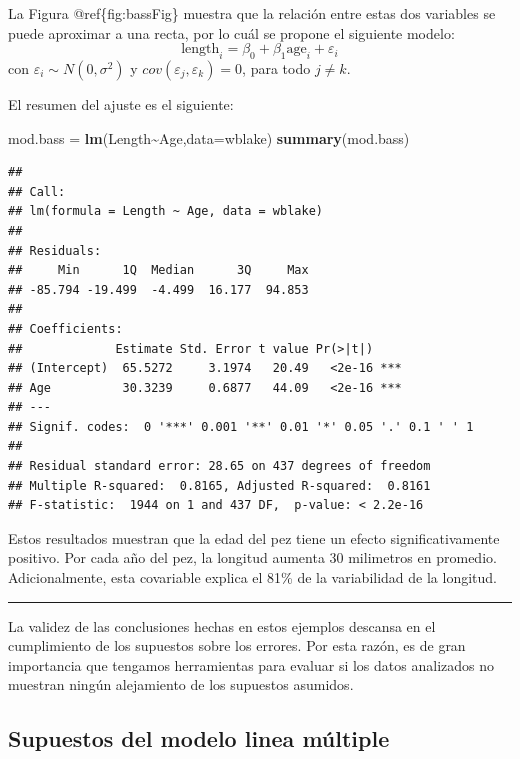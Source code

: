 \documentclass[
]{article}
\newenvironment{Shaded}{\begin{snugshade}}{\end{snugshade}}
\newcommand{\AttributeTok}[1]{\textcolor[rgb]{0.13,0.29,0.53}{#1}}
\newcommand{\FunctionTok}[1]{\textcolor[rgb]{0.13,0.29,0.53}{\textbf{#1}}}
\newcommand{\NormalTok}[1]{#1}
\newcommand{\OtherTok}[1]{\textcolor[rgb]{0.56,0.35,0.01}{#1}}
\newcommand{\SpecialCharTok}[1]{\textcolor[rgb]{0.81,0.36,0.00}{\textbf{#1}}}
\begin{document}
La Figura @ref\{fig:bassFig\} muestra que la relación entre estas dos variables se puede aproximar a una recta, por lo cuál se propone el siguiente modelo:
\[
\mbox{length}_{i} = \beta_{0} + \beta_{1}\mbox{age}_{i} + \varepsilon_{i}
\]
con \(\varepsilon_{i} \sim N\left(0,\sigma^{2} \right)\) y \(cov(\varepsilon_{j},\varepsilon_{k})=0\), para todo \(j \neq k\).

El resumen del ajuste es el siguiente:

\begin{Shaded}
\begin{Highlighting}[]
\NormalTok{mod.bass }\OtherTok{=} \FunctionTok{lm}\NormalTok{(Length}\SpecialCharTok{\textasciitilde{}}\NormalTok{Age,}\AttributeTok{data=}\NormalTok{wblake)}
\FunctionTok{summary}\NormalTok{(mod.bass)}
\end{Highlighting}
\end{Shaded}

\begin{verbatim}
## 
## Call:
## lm(formula = Length ~ Age, data = wblake)
## 
## Residuals:
##     Min      1Q  Median      3Q     Max 
## -85.794 -19.499  -4.499  16.177  94.853 
## 
## Coefficients:
##             Estimate Std. Error t value Pr(>|t|)    
## (Intercept)  65.5272     3.1974   20.49   <2e-16 ***
## Age          30.3239     0.6877   44.09   <2e-16 ***
## ---
## Signif. codes:  0 '***' 0.001 '**' 0.01 '*' 0.05 '.' 0.1 ' ' 1
## 
## Residual standard error: 28.65 on 437 degrees of freedom
## Multiple R-squared:  0.8165, Adjusted R-squared:  0.8161 
## F-statistic:  1944 on 1 and 437 DF,  p-value: < 2.2e-16
\end{verbatim}

Estos resultados muestran que la edad del pez tiene un efecto significativamente positivo. Por cada año del pez, la longitud aumenta 30 milimetros en promedio. Adicionalmente, esta covariable explica el 81\% de la variabilidad de la longitud.

\rule{\textwidth}{0.4pt}

La validez de las conclusiones hechas en estos ejemplos descansa en el cumplimiento de los supuestos sobre los errores. Por esta razón, es de gran importancia que tengamos herramientas para evaluar si los datos analizados no muestran ningún alejamiento de los supuestos asumidos.

\hypertarget{supuestos-del-modelo-linea-muxfaltiple}{%
\subsection{Supuestos del modelo linea múltiple}\label{supuestos-del-modelo-linea-muxfaltiple}}
\end{document}
